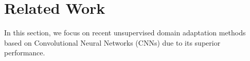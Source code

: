 \section{Related Work}
\label{section:related_work}
In this section, we focus on recent unsupervised domain adaptation methods based on Convolutional Neural Networks (CNNs) due to its superior performance.

